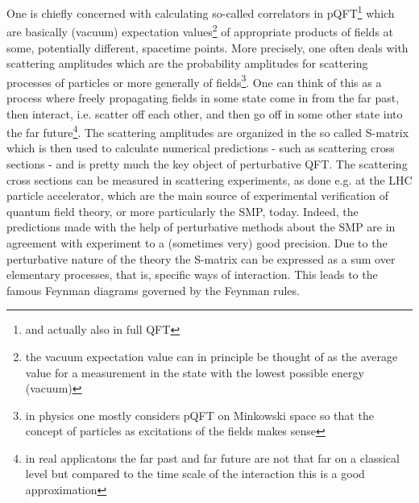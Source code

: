 One is chiefly concerned with calculating so-called correlators in pQFT\footnote{and actually also in full QFT} which are basically (vacuum) expectation values\footnote{the vacuum expectation value can in principle be thought of as the average value for a measurement in the state with the lowest possible energy (vacuum)} of appropriate products of fields at some, potentially different, spacetime points. More precisely, one often deals with scattering amplitudes which are the probability amplitudes for scattering processes of particles or more generally of fields\footnote{in physics one mostly considers pQFT on Minkowski space so that the concept of particles as excitations of the fields makes sense}. One can think of this as a process where freely propagating fields in some state come in from the far past, then interact, i.e. scatter off each other, and then go off in some other state into the far future\footnote{in real applicatons the far past and far future are not that far on a classical level but compared to the {\glqq}time scale{\grqq} of the interaction this is a good approximation}. The scattering amplitudes are organized in the so called S-matrix which is then used to calculate numerical predictions - such as scattering cross sections - and is pretty much the key object of perturbative QFT. The scattering cross sections can be measured in scattering experiments, as done e.g. at the LHC particle accelerator, which are the main source of experimental verification of quantum field theory, or more particularly the SMP, today. Indeed, the predictions made with the help of perturbative methods about the SMP are in agreement with experiment to a (sometimes very) good precision. Due to the perturbative nature of the theory the S-matrix can be expressed as a sum over elementary processes, that is, specific ways of interaction. This leads to the famous Feynman diagrams governed by the Feynman rules.
\\
